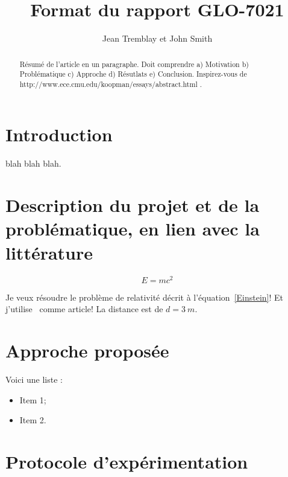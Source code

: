 \documentclass[letterpaper, 10 pt, conference]{ieeeconf}  %
\begin{document}
\title{\LARGE \bf  Format du rapport GLO-7021}


\author{Jean Tremblay et John Smith}


\maketitle
\thispagestyle{empty}
\pagestyle{empty}


\begin{abstract}

Résumé de l'article en un paragraphe. Doit comprendre a) Motivation b) Problématique c) Approche d) Résutlats e) Conclusion. Inspirez-vous de http://www.ece.cmu.edu/\tild koopman/essays/abstract.html .

\end{abstract}


\section{Introduction}

blah blah blah.

\section{Description du projet et de la problématique, en lien avec la littérature}

\begin{equation}
E=mc^2
\label{Einstein}
\end{equation}

Je veux résoudre le problème de relativité décrit à l'équation~\ref{Einstein}! Et j'utilise~\cite{c1} comme article! La distance est de $d=3~m$.

\section{Approche proposée}
Voici une liste :
\begin{itemize}
\item Item 1;
\item Item 2.
\end{itemize}

\section{Protocole d'expérimentation}
\end{document}
